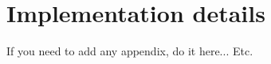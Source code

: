 \chapter{Implementation details}\label{appendix:implement}
If you need to add any appendix, do it here...
 Etc.
